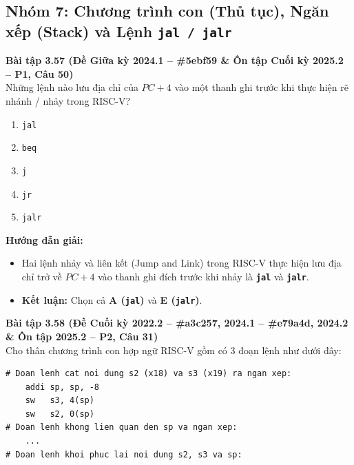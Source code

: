 \subsection{Nhóm 7: Chương trình con (Thủ tục), Ngăn xếp (Stack) và Lệnh \texttt{jal / jalr}}

\textbf{Bài tập 3.57 (Đề Giữa kỳ 2024.1 -- \#5ebf59 \& Ôn tập Cuối kỳ 2025.2 -- P1, Câu 50)}\\
Những lệnh nào lưu địa chỉ của $PC + 4$ vào một thanh ghi trước khi thực hiện rẽ nhánh / nhảy trong RISC-V?
\begin{enumerate}[label=\Alph*.]
    \item \texttt{jal}
    \item \texttt{beq}
    \item \texttt{j}
    \item \texttt{jr}
    \item \texttt{jalr}
\end{enumerate}
\textbf{Hướng dẫn giải:}
\begin{itemize}
    \item Hai lệnh nhảy và liên kết (Jump and Link) trong RISC-V thực hiện lưu địa chỉ trở về $PC + 4$ vào thanh ghi đích trước khi nhảy là \textbf{\texttt{jal}} và \textbf{\texttt{jalr}}.
    \item \textbf{Kết luận:} Chọn cả \textbf{A (\texttt{jal})} và \textbf{E (\texttt{jalr})}.
\end{itemize}

\textbf{Bài tập 3.58 (Đề Cuối kỳ 2022.2 -- \#a3c257, 2024.1 -- \#e79a4d, 2024.2 \& Ôn tập 2025.2 -- P2, Câu 31)}\\
Cho thân chương trình con hợp ngữ RISC-V gồm có 3 đoạn lệnh như dưới đây:

\noindent\begin{minipage}{\linewidth}
\begin{lstlisting}
# Doan lenh cat noi dung s2 (x18) va s3 (x19) ra ngan xep:
    addi sp, sp, -8
    sw   s3, 4(sp)
    sw   s2, 0(sp)
# Doan lenh khong lien quan den sp va ngan xep:
    ...
# Doan lenh khoi phuc lai noi dung s2, s3 va sp:
\end{lstlisting}
\end{minipage}

